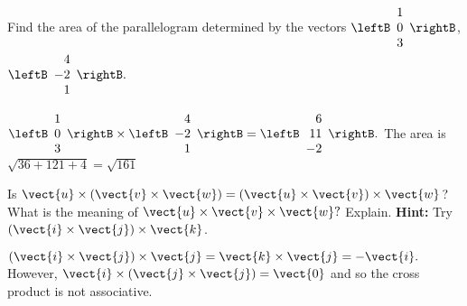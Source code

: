 \begin{enumialphparenastyle}
\begin{ex} Find the area of the parallelogram determined by the vectors
$\leftB
\begin{array}{r}
1 \\
0 \\
3
\end{array}
\rightB $, $\leftB
\begin{array}{r}
4 \\
-2 \\
1
\end{array}
\rightB .$
\begin{sol}
$\leftB \begin{array}{r}
1 \\
0 \\
3
\end{array}
\rightB \times
\leftB
\begin{array}{r}
4 \\
-2 \\
1
\end{array}
\rightB =\leftB
\begin{array}{r}
6 \\
11 \\
-2
\end{array}
\rightB .$ The area is $\sqrt{36+121+4}= \sqrt{161}$
\end{sol}
\end{ex}


\begin{ex} Is $\vect{u}\times \left( \vect{v}\times \vect{w}\right) =\left( 
\vect{u}\times \vect{v}\right) \times \vect{w}$? What is the meaning of 
$\vect{u}\times \vect{v}\times \vect{w}?$ Explain. 
\textbf{Hint: }Try $\left( \vect{i}\times \vect{j}
\right)\times \vect{k}$.
\begin{sol}
 $\left( \vect{i}\times \vect{j}\right) \times
\vect{j}=\vect{k}\times \vect{j}=-\vect{i}.$ However, $\vect{i}\times \left( \vect{j}\times \vect{j}
\right) =\vect{0}$ and so the cross product is not associative.
\end{sol}
\end{ex}


\end{enumialphparenastyle}
